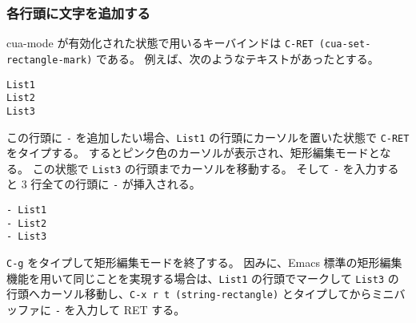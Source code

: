 \subsubsection{各行頭に文字を追加する}
cua-mode が有効化された状態で用いるキーバインドは \texttt{C-RET (cua-set-rectangle-mark)} である。
例えば、次のようなテキストがあったとする。
\begin{mdframed}[roundcorner=0.50zw,leftmargin=3.00zw,rightmargin=3.00zw,skipabove=0.40zw,skipbelow=0.40zw,innertopmargin=4.00pt,innerbottommargin=4.00pt,innerleftmargin=5.00pt,innerrightmargin=5.00pt,linecolor=gray!020,linewidth=0.50pt,backgroundcolor=gray!20]
\begin{verbatim}
List1
List2
List3
\end{verbatim}
\end{mdframed}
この行頭に \texttt{-} を追加したい場合、\texttt{List1} の行頭にカーソルを置いた状態で \texttt{C-RET} をタイプする。
するとピンク色のカーソルが表示され、矩形編集モードとなる。
この状態で \texttt{List3} の行頭までカーソルを移動する。
そして \texttt{-} を入力すると 3 行全ての行頭に \texttt{-} が挿入される。
\begin{mdframed}[roundcorner=0.50zw,leftmargin=3.00zw,rightmargin=3.00zw,skipabove=0.40zw,skipbelow=0.40zw,innertopmargin=4.00pt,innerbottommargin=4.00pt,innerleftmargin=5.00pt,innerrightmargin=5.00pt,linecolor=gray!020,linewidth=0.50pt,backgroundcolor=gray!20]
\begin{verbatim}
- List1
- List2
- List3
\end{verbatim}
\end{mdframed}
\texttt{C-g} をタイプして矩形編集モードを終了する。
因みに、Emacs 標準の矩形編集機能を用いて同じことを実現する場合は、\texttt{List1} の行頭でマークして \texttt{List3} の行頭へカーソル移動し、\texttt{C-x r t (string-rectangle)} とタイプしてからミニバッファに \texttt{-} を入力して RET する。
